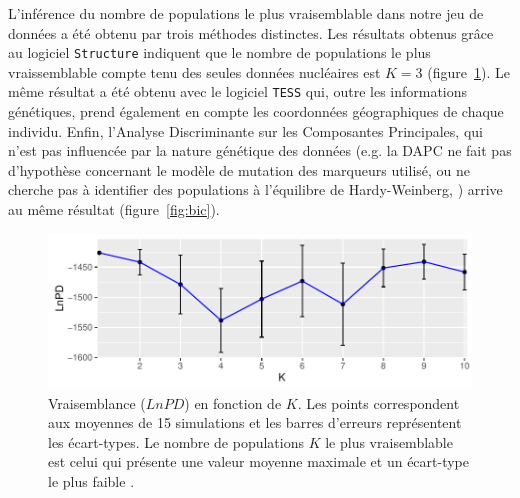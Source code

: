 \documentclass[a4paper,12pt,twoside]{article}\usepackage[]{graphicx}\usepackage[]{color}
\makeatletter
\def\maxwidth{ %
  \ifdim\Gin@nat@width>\linewidth
    \linewidth
  \else
    \Gin@nat@width
  \fi
}
\makeatother
\begin{document}
L'inférence du nombre de populations le plus vraisemblable dans notre jeu de données a été obtenu par trois méthodes distinctes. Les résultats obtenus grâce au logiciel \texttt{Structure} \citep{pritchard2000} indiquent que le nombre de populations le plus vraissemblable compte tenu des seules données nucléaires est $K=3$ (figure~\ref{fig:lnpd}). Le même résultat a été obtenu avec le logiciel \texttt{TESS} \citep[][figure~\ref{fig:dic}]{durand2009} qui, outre les informations génétiques, prend également en compte les coordonnées géographiques de chaque individu. 
Enfin, l'Analyse Discriminante sur les Composantes Principales, qui n'est pas influencée par la nature génétique des données (e.g. la DAPC ne fait pas d'hypothèse concernant le modèle de mutation des marqueurs utilisé, ou ne cherche pas à identifier des populations à l'équilibre de Hardy-Weinberg, \citealp{jombart2008}) arrive au même résultat (figure~\ref{fig:bic}).

\begin{figure}[htpb]

{\centering \includegraphics[width=\maxwidth]{figure/lnpd-1} 

}

\caption[Vraisemblance ($LnPD$) en fonction de $K$.]{Vraisemblance ($LnPD$) en fonction de $K$. Les points correspondent aux moyennes de 15 simulations et les barres d'erreurs représentent les écart-types. Le nombre de populations $K$ le plus vraisemblable est celui qui présente une valeur moyenne maximale et un écart-type le plus faible \citep{pritchard2000}.}\label{fig:lnpd}
\end{figure}
\end{document}
